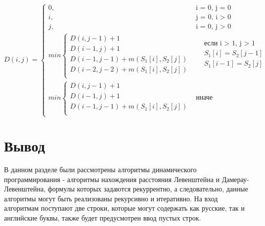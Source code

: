 \begin{equation}
	\label{eq:DL}
	D(i, j) = 
	\begin{cases}
		0, &\text{i = 0, j = 0}\\
		i, &\text{j = 0, i > 0}\\
		j, &\text{i = 0, j > 0}\\
		min \begin{cases}
			D(i, j - 1) + 1\\
			D(i - 1, j) + 1\\
			D(i - 1, j - 1) + m(S_{1}[i], S_{2}[j]) \\
			D(i - 2, j - 2) + m(S_{1}[i], S_{2}[j]) \\
		\end{cases}
		& \begin{aligned}
			& \text{если i > 1, j > 1} \\
			& S_{1}[i] = S_{2}[j - 1] \\
			& S_{1}[i - 1] = S_{2}[j] \\
		\end{aligned}\\
		min \begin{cases}
			D(i, j - 1) + 1\\
			D(i - 1, j) + 1 \\
			D(i - 1, j - 1) + m(S_{1}[i], S_{2}[j]) \\
		\end{cases}
		 & \text{иначе}
	\end{cases}
\end{equation}


\section*{Вывод}

В данном разделе были рассмотрены алгоритмы динамического программирования - алгоритмы нахождения расстояния Левенштейна и Дамерау-Левенштейна, формулы которых задаются рекуррентно, а следовательно, данные алгоритмы могут быть реализованы рекурсивно и итеративно. На вход алгоритмам поступают две строки, которые могут содержать как русские, так и английские буквы, также будет предусмотрен ввод пустых строк.
